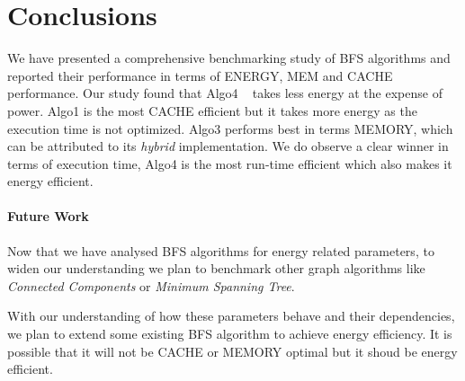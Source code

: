 \section{Conclusions}
\label{conc}

%
%
%

We have presented a comprehensive benchmarking study of BFS algorithms
and reported their performance in terms of ENERGY, MEM and CACHE
performance.  Our study found that Algo4 ~\cite{LIGRA-BFS} takes less
energy at the expense of power.  Algo1 is the most CACHE efficient but
it takes more energy as the execution time is not optimized.  Algo3
performs best in terms MEMORY, which can be attributed to its
\emph{hybrid} implementation.  We do observe a clear winner in terms
of execution time,  Algo4 is the most run-time efficient which also
makes it energy efficient.

\paragraph{Future Work}
Now that we have analysed BFS algorithms for energy related
parameters, to widen our understanding we plan to benchmark other
graph algorithms like \emph{Connected Components} or \emph{Minimum
Spanning Tree}.

With our understanding of how these parameters behave and their
dependencies, we plan to extend some existing BFS algorithm to achieve
energy efficiency.  It is possible that it will not be CACHE or MEMORY
optimal but it shoud be energy efficient.


%
%
%
%
%
%
%

